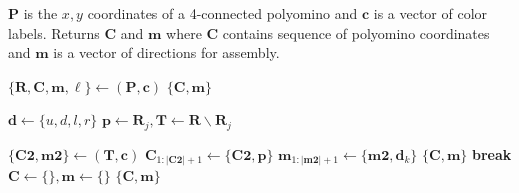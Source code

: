 \begin{algorithm}
\newcommand\algotext[1]{\end{algorithmic}#1\begin{algorithmic}[1]}
\caption{($\mathbf{P},\mathbf{c})$   \label{alg:Decompose}}
$\mathbf{P}$ is the $x,y$ coordinates of a 4-connected polyomino and $ \mathbf{c} $ is a vector of color labels.
Returns $ \mathbf{C} $ and $\mathbf{m}$ where $ \mathbf{C} $ contains sequence of polyomino coordinates and $\mathbf{m}$ is a vector of directions for assembly.
\begin{algorithmic}[1]

\State $ \{ \mathbf{R},\mathbf{C}, \mathbf{m}, \ell \} \gets ${}$(\mathbf{P},\mathbf{c})$
\State \Return $\{ \mathbf{C},\mathbf{m} \}$ 
\EndIf

\State $\mathbf{d} \gets\{u,d,l,r\}$
\State $\mathbf{p} \gets \mathbf{R}_j,  \mathbf{T} \gets  \mathbf{R}  \backslash   \mathbf{R}_j$

\State $\{\mathbf{C2},\mathbf{m2} \}\gets ${}$(\mathbf{T},\mathbf{c})$
\State $\mathbf{C}_{1:|\mathbf{C2}|+1} \gets \{\mathbf{C2},\mathbf{p}\}$
\State $ \mathbf{m}_{1:|\mathbf{m2}|+1} \gets \{\mathbf{m2},\mathbf{d}_k\}$
\State \Return $\{ \mathbf{C}, \mathbf{m} \}$ 
\EndIf
\State \textbf{break}
\EndIf
\EndFor
\EndFor
\State $\mathbf{C} \gets \{\}, \mathbf{m} \gets \{\}$
\State \Return $\{ \mathbf{C}, \mathbf{m} \}$ 
\end{algorithmic}
\end{algorithm} 



